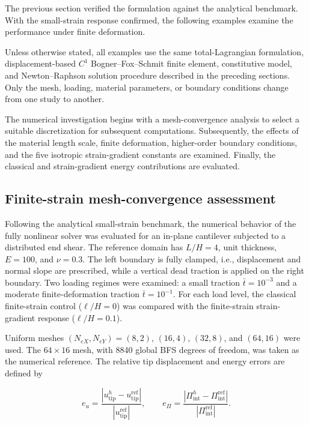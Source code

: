 \documentclass[preprint,12pt]{elsarticle}
\begin{document}
\label{sec:numerical-results-discussion}

The previous section verified the formulation against the analytical
benchmark. With the small-strain response confirmed, the following
examples examine the performance under finite deformation.

Unless otherwise stated, all examples use the same total-Lagrangian
formulation, displacement-based $C^1$ Bogner--Fox--Schmit finite element,
constitutive model, and Newton--Raphson solution procedure described in the
preceding sections. Only the mesh, loading, material parameters, or
boundary conditions change from one study to another.

The numerical investigation begins with a mesh-convergence analysis to
select a suitable discretization for subsequent computations.
Subsequently, the effects of the material length scale, finite
deformation, higher-order boundary conditions, and the five isotropic
strain-gradient constants are examined. Finally, the classical and
strain-gradient energy contributions are evaluated.

\subsection{Finite-strain mesh-convergence assessment}

\label{sec:finite_strain_mesh}

Following the analytical small-strain benchmark, the numerical behavior of
the fully nonlinear solver was evaluated for an in-plane cantilever subjected
to a distributed end shear.  The reference domain has $L/H=4$, unit
thickness, $E=100$, and $\nu=0.3$.  The left boundary is fully clamped,
i.e., displacement and normal slope are prescribed, while a vertical dead
traction is applied on the right boundary.  Two loading regimes were
examined: a small traction $\bar t=10^{-3}$ and a moderate
finite-deformation traction $\bar t=10^{-1}$.  For each load level, the
classical finite-strain control ($\ell/H=0$) was compared with the
finite-strain strain-gradient response ($\ell/H=0.1$).

Uniform meshes $(N_{eX},N_{eY})=(8,2)$, $(16,4)$, $(32,8)$, and
$(64,16)$ were used.  The $64\times16$ mesh, with 8840 global BFS degrees
of freedom, was taken as the numerical reference.  The relative tip
displacement and energy errors are defined by

\begin{equation}
 e_u=\frac{|u_{\mathrm{tip}}^h-u_{\mathrm{tip}}^{\mathrm{ref}}|}
 {|u_{\mathrm{tip}}^{\mathrm{ref}}|},
 \qquad
 e_{\Pi}=\frac{|\Pi_{\mathrm{int}}^h-\Pi_{\mathrm{int}}^{\mathrm{ref}}|}
 {|\Pi_{\mathrm{int}}^{\mathrm{ref}}|}.
 \label{eq:finite_mesh_errors}
\end{equation}
\end{document}
